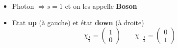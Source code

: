 \begin{itemize}
	\item Photon $\Rightarrow s = 1$ et on les appelle \textbf{Boson}
	      	
	\item Etat \textbf{up} (à gauche) et état \textbf{down} (à droite)
	      \begin{equation}
	      	\chi _{\frac{1}{2}} = 
	      	\left(
	      	\begin{array}{c}
	      		1 \\ 
	      		0 
	      	\end{array}
	      	\right) 
	      	\qquad
	      	\chi _{-\frac{1}{2}} =
	      	\left(						
	      	\begin{array}{c}
	      		0 \\ 
	      		1 
	      	\end{array} 
	      	\right)		
	      \end{equation}
	      		
\end{itemize}